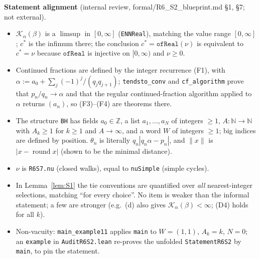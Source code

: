 \documentclass[11pt]{amsart}
\theoremstyle{definition}
\theoremstyle{remark}
\newcommand{\Z}{\mathbb{Z}}
\newcommand{\N}{\mathbb{N}}
\newcommand{\dist}[1]{\lVert #1\rVert}
\newcommand{\KL}{\mathcal{K}}
\newcommand{\rnd}{\operatorname{round}}
\begin{document}
\medskip\noindent\textbf{Statement alignment} (internal review, formal/R6\_S2\_blueprint.md \S1, \S7; not external).
\begin{itemize}
\item $\KL_\alpha(\beta)$ is a $\limsup$ in $[0,\infty]$ (\texttt{ENNReal}), matching the value range $[0,\infty]$;
$c^*$ is the infimum there; the conclusion $c^*=\texttt{ofReal}(\nu)$ is equivalent to $c^*=\nu$ because
$\texttt{ofReal}$ is injective on $[0,\infty)$ and $\nu\ge0$.
\item Continued fractions are defined by the integer recurrence (F1), with $\alpha:=a_0+\sum_j(-1)^j/(q_jq_{j+1})$;
\texttt{tendsto\_conv} and \texttt{cf\_algorithm} prove that $p_n/q_n\to\alpha$ and that the regular continued-fraction
algorithm applied to $\alpha$ returns $(a_n)$, so (F3)--(F4) are theorems there.
\item The structure \texttt{BH} has fields $a_0\in\Z$, a list $a_1,\dots,a_N$ of integers $\ge1$, $A:\N\to\N$ with
$A_k\ge1$ for $k\ge1$ and $A\to\infty$, and a word $W$ of integers $\ge1$; big indices are defined by position.
$\theta_n$ is literally $q_n|q_n\alpha-p_n|$, and $\dist{x}$ is $|x-\rnd x|$ (shown to be the minimal distance).
\item $\nu$ is \texttt{R6S7.nu} (closed walks), equal to \texttt{nuSimple} (simple cycles).
\item In Lemma~\ref{lem:S1} the tie conventions are quantified over \emph{all} nearest-integer selections, matching
``for every choice''. No item is weaker than the informal statement; a few are stronger (e.g.\ (d) also gives
$\KL_\alpha(\beta)<\infty$; (D4) holds for all $k$).
\item Non-vacuity: \texttt{main\_example11} applies \texttt{main} to $W=(1,1)$, $A_k=k$, $N=0$; an \texttt{example} in
\texttt{AuditR6S2.lean} re-proves the unfolded \texttt{StatementR6S2} by \texttt{main}, to pin the statement.
\end{itemize}
\end{document}
